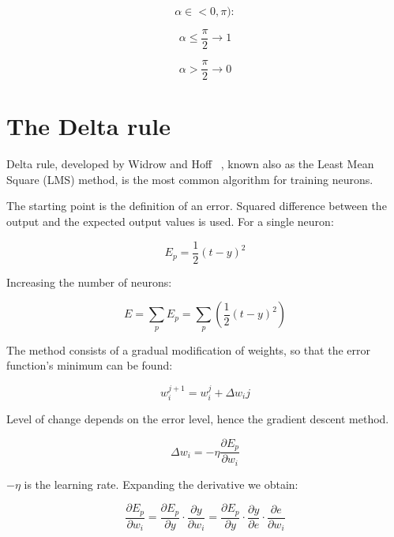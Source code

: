 \documentclass[10pt,oneside]{memoir}
\begin{document}
\begin{equation}
\alpha \in <0,\pi ):
\end{equation}


\begin{equation}
\alpha \le \frac{\pi }{2}\to 1
\end{equation}


\begin{equation}
\alpha >\frac{\pi }{2}\to 0
\end{equation}


\section{The Delta rule}
\label{thedeltarule}

Delta rule, developed by Widrow and Hoff ~\cite{Widrow:Hoff:1960}, known also as the Least Mean Square (LMS) method, is the most common algorithm for training neurons.


The starting point is the definition of an error. Squared difference between the output and the expected output values is used. For a single neuron:


\begin{equation}
{E}_{p}=\frac{1}{2}{(t-y)}^{2}
\end{equation}


Increasing the number of neurons:


\begin{equation}
E=\sum _{p}{E}_{p}=\sum _{p}\left(\frac{1}{2}{(t-y)}^{2}\right)
\end{equation}


The method consists of a gradual modification of weights, so that the error function's minimum can be found:


\begin{equation}
{w}_{i}^{j+1}={w}_{i}^{j}+\Delta {w}_{i}j
\end{equation}


Level of change depends on the error level, hence the gradient descent method.


\begin{equation}
\Delta {w}_{i}=-\eta \frac{\partial {E}_{p}}{\partial {w}_{i}}
\end{equation}


$-\eta $ is the learning rate. Expanding the derivative we obtain:


\begin{equation}
\frac{\partial {E}_{p}}{\partial {w}_{i}}=\frac{\partial {E}_{p}}{\partial y}\cdot \frac{\partial y}{\partial {w}_{i}}=\frac{\partial {E}_{p}}{\partial y}\cdot \frac{\partial y}{\partial e}\cdot \frac{\partial e}{\partial {w}_{i}}
\end{equation}
\end{document}
